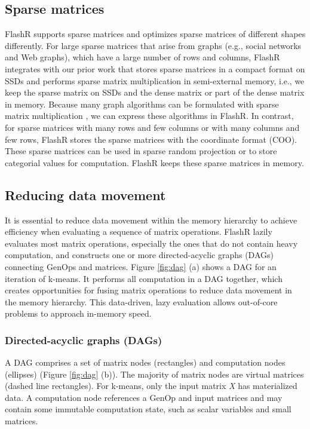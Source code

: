 \subsection{Sparse matrices}
FlashR supports sparse matrices and optimizes sparse matrices of different
shapes differently.
For large sparse matrices that arise from graphs (e.g., social networks
and Web graphs), which have a large number of rows and columns, FlashR integrates
with our prior work \cite{SEM_SpMM} that stores sparse matrices
in a compact format on SSDs and performs sparse matrix multiplication
in semi-external memory, i.e., we keep the sparse matrix on SSDs and
the dense matrix or part of the dense matrix in memory.
Because many graph algorithms can be formulated with sparse matrix multiplication
\cite{linear_algebra}, we can express these algorithms in FlashR. In contrast,
for sparse matrices with many rows and few columns or with many columns
and few rows, FlashR stores the sparse matrices with the coordinate format
(COO). These sparse matrices can be used in sparse random projection
\cite{sparse_proj} or to store categorial values for computation.
FlashR keeps these sparse matrices in memory.

\subsection{Reducing data movement}\label{sec:datamove}
It is essential to reduce data movement within the memory hierarchy to achieve
efficiency when evaluating a sequence of matrix operations. FlashR lazily
evaluates most matrix
operations, especially the ones that do not contain heavy computation,
and constructs one or more directed-acyclic graphs (DAGs) connecting GenOps and
matrices. Figure \ref{fig:dag} (a) shows a DAG for an iteration of k-means.
It performs all computation in a DAG together, which creates opportunities
for fusing matrix operations to reduce data movement in the memory hierarchy.
This data-driven, lazy evaluation allows out-of-core problems 
to approach in-memory speed.

\subsubsection{Directed-acyclic graphs (DAGs)} \label{dag}
A DAG comprises a set of matrix nodes (rectangles) and computation nodes
(ellipses) (Figure \ref{fig:dag} (b)). The majority of matrix nodes are
virtual matrices (dashed line rectangles).
For k-means, only the input matrix \textit{X} has materialized data.
A computation node references a GenOp and input matrices and
may contain some immutable computation state, such as scalar variables and
small matrices. 

